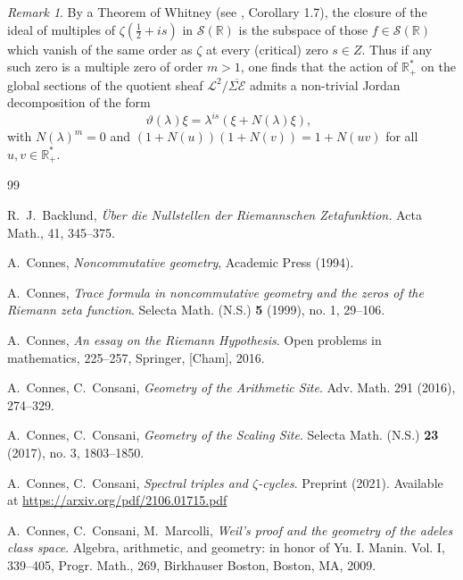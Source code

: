 \documentclass{pspum-l}
\theoremstyle{definition}
\theoremstyle{remark}
\newtheorem{remark}[theorem]{Remark}
\numberwithin{equation}{section}
\def\R{{\mathbb R}}
\def\cE{{\mathcal E}}
\def\cL{{\mathcal L}}
\def\cS{{\mathcal S}}
\def\rep{\vartheta}
\begin{document}
 \begin{remark}\label{remtauto}  By a Theorem of Whitney (see \cite{Malgrange}, Corollary 1.7), the closure  of the ideal of multiples of $\zeta\left(\frac 12 +is\right)$ in $\cS(\R)$ is the subspace of those  $f\in\cS(\R)$ which vanish of the same order as $\zeta$ at every (critical) zero $s\in Z$. Thus if any such zero is a multiple zero of order $m>1$, one finds that the action of $\R_+^*$ on the global sections of the quotient sheaf $\cL^2/\overline{\Sigma\cE}$ admits a non-trivial Jordan decomposition  of the form
 $$
 \rep(\lambda)\xi=\lambda^{is}(\xi+N(\lambda)\xi), \ \ 
 $$
 with $N(\lambda)^m=0$ and  $(1+N(u))(1+N(v))=1+N(uv)$ for all $u,v\in \R_+^*$.
 \end{remark}




   \begin{thebibliography}{99} %

 R.~J.~Backlund, {\em \"Uber die Nullstellen der {\it Riemannschen Zetafunktion.}} Acta Math., 41, 345--375.

  A.~Connes, {\it Noncommutative geometry}, Academic Press (1994).



  A.~Connes, \emph{Trace formula in noncommutative geometry and the zeros of the Riemann zeta function}.  Selecta Math. (N.S.)  \textbf{5}  (1999),  no. 1, 29--106.
 
  A.~Connes, \emph{An essay on the Riemann Hypothesis}. Open problems in mathematics, 225--257, Springer, [Cham], 2016. 


 A.~Connes, C.~Consani, {\em Geometry of the Arithmetic Site}. Adv. Math. 291 (2016), 274--329.



 A.~Connes, C.~Consani, \emph{Geometry of the Scaling Site}.  Selecta Math. (N.S.) \textbf{23} (2017), no. 3, 1803--1850.

 A.~Connes, C.~Consani, {\em Spectral triples and $\zeta$-cycles}. Preprint (2021). Available at  \url{https://arxiv.org/pdf/2106.01715.pdf}

 A.~Connes, C.~Consani, M.~Marcolli, {\em Weil's proof
and the geometry of the adeles class space}. Algebra, arithmetic, and geometry: in honor of Yu. I. Manin. Vol. I, 339--405, Progr. Math., 269, Birkhauser Boston, Boston, MA, 2009.


\end{thebibliography}
\end{document}
